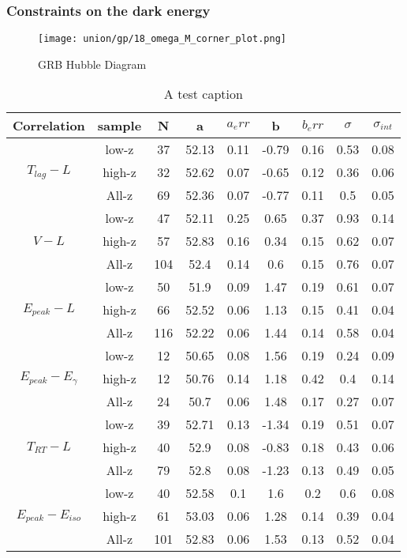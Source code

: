 \subsubsection{Constraints on the dark energy}
\begin{figure}[H]
	\centering
	\texttt{[image: union/gp/18\_omega\_M\_corner\_plot.png]}
	\caption{GRB Hubble Diagram}
	\label{fig:OmegaM_GP_union}
\end{figure}
\begin{table}
\centering
\begin{tabular}{|c|c|c|c|c|c|c|c|c|}
\hline
Correlation & sample & N & a & $a_err$ & b & $b_err$ & $\sigma$ & $\sigma_{int}$\\
\hline
\multirow{3}{*}{$T_{lag}-L$} & low-z & 37 & 52.13 & 0.11 & -0.79 & 0.16 & 0.53 & 0.08\\
\cline{2-9}
 & high-z & 32 & 52.62 & 0.07 & -0.65 & 0.12 & 0.36 & 0.06\\
\cline{2-9}
 & All-z & 69 & 52.36 & 0.07 & -0.77 & 0.11 & 0.5 & 0.05\\
\hline
\multirow{3}{*}{$V-L$} & low-z & 47 & 52.11 & 0.25 & 0.65 & 0.37 & 0.93 & 0.14\\
\cline{2-9}
 & high-z & 57 & 52.83 & 0.16 & 0.34 & 0.15 & 0.62 & 0.07\\
\cline{2-9}
 & All-z & 104 & 52.4 & 0.14 & 0.6 & 0.15 & 0.76 & 0.07\\
\hline
\multirow{3}{*}{$E_{peak}-L$} & low-z & 50 & 51.9 & 0.09 & 1.47 & 0.19 & 0.61 & 0.07\\
\cline{2-9}
 & high-z & 66 & 52.52 & 0.06 & 1.13 & 0.15 & 0.41 & 0.04\\
\cline{2-9}
 & All-z & 116 & 52.22 & 0.06 & 1.44 & 0.14 & 0.58 & 0.04\\
\hline
\multirow{3}{*}{$E_{peak}-E_{\gamma}$} & low-z & 12 & 50.65 & 0.08 & 1.56 & 0.19 & 0.24 & 0.09\\
\cline{2-9}
 & high-z & 12 & 50.76 & 0.14 & 1.18 & 0.42 & 0.4 & 0.14\\
\cline{2-9}
 & All-z & 24 & 50.7 & 0.06 & 1.48 & 0.17 & 0.27 & 0.07\\
\hline
\multirow{3}{*}{$T_{RT}-L$} & low-z & 39 & 52.71 & 0.13 & -1.34 & 0.19 & 0.51 & 0.07\\
\cline{2-9}
 & high-z & 40 & 52.9 & 0.08 & -0.83 & 0.18 & 0.43 & 0.06\\
\cline{2-9}
 & All-z & 79 & 52.8 & 0.08 & -1.23 & 0.13 & 0.49 & 0.05\\
\hline
\multirow{3}{*}{$E_{peak}-E_{iso}$} & low-z & 40 & 52.58 & 0.1 & 1.6 & 0.2 & 0.6 & 0.08\\
\cline{2-9}
 & high-z & 61 & 53.03 & 0.06 & 1.28 & 0.14 & 0.39 & 0.04\\
\cline{2-9}
 & All-z & 101 & 52.83 & 0.06 & 1.53 & 0.13 & 0.52 & 0.04\\
\hline
\end{tabular}
\caption{A test caption}
\label{table_gp_union}
\end{table}